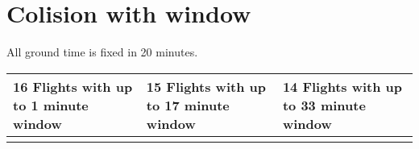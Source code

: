 \documentclass{endm}
\begin{document}
\newpage
\section{Colision with window}

All ground time is fixed in 20 minutes.

\begin{center}

\renewcommand{\arraystretch}{0.6}

\label {tabela4}
\begin{longtable}{lll} 

\hline
\scriptsize 16 Flights with up to 1 minute window & \scriptsize 15 Flights with up to 17 minute window & \scriptsize 14 Flights with up to 33 minute window \\
\hline
\\


\end{longtable}
\end{center}
\end{document}
